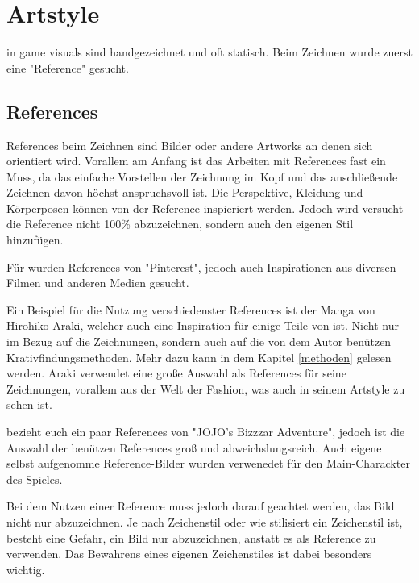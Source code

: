 
\section{Artstyle}\label{sec:artstyle}

\renewcommand{\kapitelautor}{Autor: Philip Jankovic}

\FF in game visuals sind handgezeichnet und oft statisch. Beim Zeichnen wurde zuerst eine "Reference" gesucht.


\subsection{References}\label{subsec:references}
References beim Zeichnen sind Bilder oder andere Artworks an denen sich orientiert wird. Vorallem am Anfang ist das
Arbeiten mit References fast ein Muss, da das einfache Vorstellen der Zeichnung im Kopf und das anschließende Zeichnen davon höchst anspruchsvoll ist.
Die Perspektive, Kleidung und Körperposen können von der Reference inspieriert werden.
Jedoch wird versucht die Reference nicht 100\% abzuzeichnen, sondern auch den eigenen Stil hinzufügen. 


Für \FF wurden References von "Pinterest", jedoch auch Inspirationen aus diversen Filmen und anderen Medien gesucht. 


Ein Beispiel für die Nutzung verschiedenster References ist der Manga  von Hirohiko Araki,
welcher auch eine Inspiration für einige Teile von \FF ist. Nicht nur im Bezug auf die Zeichnungen, sondern auch auf die von dem Autor benützen Krativfindungsmethoden.
Mehr dazu kann in dem Kapitel \ref{methoden} gelesen werden.
Araki verwendet eine große Auswahl als References für seine Zeichnungen, vorallem aus der Welt
der Fashion, was auch in seinem Artstyle zu sehen ist.


\FF bezieht euch ein paar References von "JOJO's Bizzzar Adventure", jedoch ist die Auswahl der benützen References groß und abweichslungsreich.
Auch eigene selbst aufgenomme Reference-Bilder wurden verwenedet für \zB den Main-Charackter des Spieles.





Bei dem Nutzen einer Reference muss jedoch darauf geachtet werden, das Bild nicht nur abzuzeichnen. Je nach Zeichenstil
oder wie stilisiert ein Zeichenstil ist, besteht eine Gefahr, ein Bild nur abzuzeichnen, anstatt es als Reference zu verwenden.
Das Bewahrens eines eigenen Zeichenstiles ist dabei besonders wichtig.


